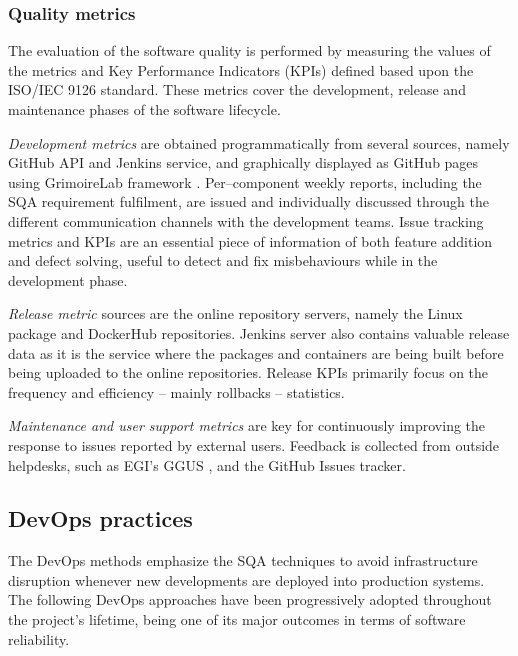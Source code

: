 \documentclass[journal]{IEEEtran}
\begin{document}
\subsubsection{Quality metrics}

The evaluation of the software quality is performed by measuring the values of
the metrics and Key Performance Indicators (KPIs) defined based upon the
ISO/IEC 9126 standard. These metrics cover the development, release and
maintenance phases of the software lifecycle.

\textit{Development metrics} are obtained programmatically from several sources, namely GitHub
API and Jenkins service, and graphically displayed as GitHub pages using GrimoireLab
framework \cite{grimoirelab}. Per--component weekly reports, including the SQA requirement
fulfilment, are issued and individually discussed through the different communication channels
with the development teams. Issue tracking metrics and KPIs are an essential piece of information
of both feature addition and defect solving, useful to detect and fix misbehaviours while in the
development phase.

\textit{Release metric} sources are the online repository servers, namely the
Linux package \cite{indigo-pkg-repo} and DockerHub \cite{indigo-dockerhub} repositories. Jenkins
server also contains valuable release data as it is the service where the packages
and containers are being built before being uploaded to the online repositories. Release
KPIs primarily focus on the frequency and efficiency -- mainly rollbacks -- statistics.

\textit{Maintenance and user support metrics} are key for continuously improving the response
to issues reported by external users. Feedback is collected from outside helpdesks, such as
EGI's GGUS \cite{ggus}, and the GitHub Issues tracker.

\subsection{DevOps practices}
\label{sec:devops}
The DevOps methods emphasize the SQA techniques to avoid infrastructure
disruption whenever new developments are deployed into production systems. The
following DevOps approaches have been progressively adopted throughout the project's
lifetime, being one of its major outcomes in terms of software reliability.
\end{document}
